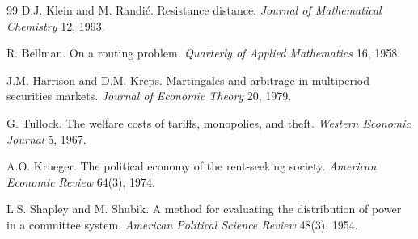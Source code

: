 \documentclass[11pt]{article}
\theoremstyle{plain}
\theoremstyle{definition}
\theoremstyle{remark}
\begin{document}
\begin{thebibliography}{99}
 D.J. Klein and M. Randi\'c.
\newblock Resistance distance. \emph{Journal of Mathematical Chemistry} 12,
1993.

 R. Bellman.
\newblock On a routing problem. \emph{Quarterly of Applied Mathematics} 16,
1958.

 J.M. Harrison and D.M. Kreps.
\newblock Martingales and arbitrage in multiperiod securities markets.
\newblock \emph{Journal of Economic Theory} 20, 1979.

 G. Tullock.
\newblock The welfare costs of tariffs, monopolies, and theft.
\newblock \emph{Western Economic Journal} 5, 1967.

 A.O. Krueger.
\newblock The political economy of the rent-seeking society.
\newblock \emph{American Economic Review} 64(3), 1974.

 L.S. Shapley and M. Shubik.
\newblock A method for evaluating the distribution of power in a committee
system. \emph{American Political Science Review} 48(3), 1954.

\end{thebibliography}
\end{document}
